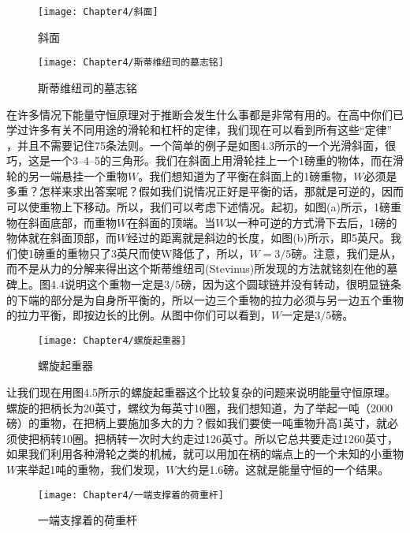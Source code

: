 \begin{figure}[htbp]
    \centering
    \begin{minipage}[t]{0.4\textwidth}
        \centering
        \texttt{[image: Chapter4/斜面]}
        \caption{斜面}
    \end{minipage}
    \begin{minipage}[t]{0.4\textwidth}
        \centering
        \texttt{[image: Chapter4/斯蒂维纽司的墓志铭]}
        \caption{斯蒂维纽司的墓志铭}
    \end{minipage}
\end{figure}

在许多情况下能量守恒原理对于推断会发生什么事都是非常有用的。在高中你们已学过许多有关不同用途的滑轮和杠杆的定律，我们现在可以看到所有这些“定律” ，并且不需要记住75条法则。一个简单的例子是如图4.3所示的一个光滑斜面，很巧，这是一个3--4--5的三角形。我们在斜面上用滑轮挂上一个1磅重的物体，而在滑轮的另一端悬挂一个重物$ W $。我们想知道为了平衡在斜面上的1磅重物，$ W $必须是多重？怎样来求出答案呢？假如我们说情况正好是平衡的话，那就是可逆的，因而可以使重物上下移动。所以，我们可以考虑下述情况。起初，如图(a)所示，1磅重物在斜面底部，而重物$ W $在斜面的顶端。当$ W $以一种可逆的方式滑下去后，1磅的物体就在斜面顶部，而$ W $经过的距离就是斜边的长度，如图(b)所示，即5英尺。我们使1磅重的重物只了3英尺而使W降低了，所以，$ W=3/5 $磅。注意，我们是从，而不是从力的分解来得出这个斯蒂维纽司(Stevinus)所发现的方法就铭刻在他的墓碑上。图4.4说明这个重物一定是$ 3/5 $磅，因为这个圆球链并没有转动，很明显链条的下端的部分是为自身所平衡的，所以一边三个重物的拉力必须与另一边五个重物的拉力平衡，即按边长的比例。从图中你们可以看到，$W$一定是$ 3/5 $磅。

\begin{wrapfigure}{l}{0.4\textwidth}
    \centering
    \texttt{[image: Chapter4/螺旋起重器]}
    \caption{螺旋起重器}
    \label{figure:螺旋起重器}
\end{wrapfigure}

让我们现在用图4.5所示的螺旋起重器这个比较复杂的问题来说明能量守恒原理。螺旋的把柄长为20英寸，螺纹为每英寸10圈，我们想知道，为了举起一吨（2000磅）的重物，在把柄上要施加多大的力？假如我们要使一吨重物升高1英寸，就必须使把柄转10圈。把柄转一次时大约走过126英寸。所以它总共要走过1260英寸，如果我们利用各种滑轮之类的机械，就可以用加在柄的端点上的一个未知的小重物$ W $来举起1吨的重物，我们发现，$ W $大约是1.6磅。这就是能量守恒的一个结果。

\begin{wrapfigure}{r}{0.4\textwidth}
    \centering
    \texttt{[image: Chapter4/一端支撑着的荷重杆]}
    \caption{一端支撑着的荷重杆}
    \label{figure:一端支撑着的荷重杆}
\end{wrapfigure}

